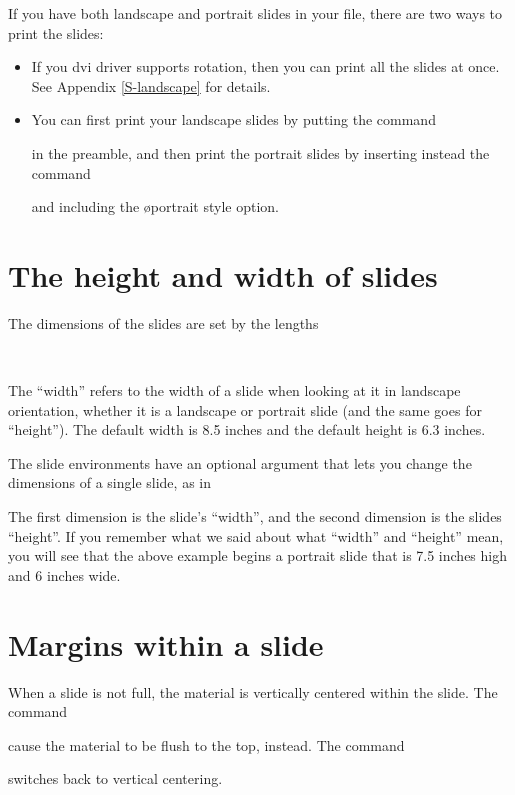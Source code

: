 If you have both landscape and portrait slides in your file, there are two
ways to print the slides:
\begin{itemize}
  \item If you dvi driver supports rotation, then you can print all the slides
at once. See Appendix \ref{S-landscape} for details.
  \item You can first print your landscape slides by putting the command
\begin{MD}
  \landscapeonly
\end{MD}
in the preamble, and then print the portrait slides by inserting instead the
command
\begin{MD}
  \portraitonly
\end{MD}
and including the \o{portrait} style option.
\end{itemize}

\section{The height and width of slides\label{slidedim}}

The dimensions of the slides are set by the lengths
\begin{MD}
  \slidewidth\\
  \slideheight
\end{MD}
The ``width'' refers to the width of a slide when looking at it in landscape
orientation, whether it is a landscape or portrait slide (and the same goes
for ``height''). The default width is 8.5 inches and the default height is 6.3
inches.

The slide environments have an optional argument that lets you change the
dimensions of a single slide, as in
\begin{LVerbatim}
  \begin{slide*}[7.5in,6in]
\end{LVerbatim}
The first dimension is the slide's ``width'', and the second dimension is the
slides ``height''. If you remember what we said about what ``width'' and
``height'' mean, you will see that the above example begins a portrait slide
that is 7.5 inches high and 6 inches wide.


\section{Margins within a slide}

When a slide is not full, the material is vertically centered within the
slide. The command
\begin{MD}
  \centerslidesfalse
\end{MD}
cause the material to be flush to the top, instead. The command
\begin{MD}
  \centerslidestrue
\end{MD}
switches back to vertical centering.

